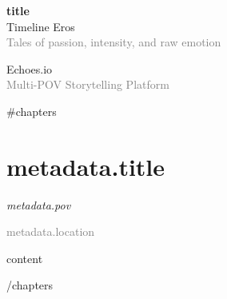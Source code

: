 \documentclass[12pt,a5paper]{book}
\newcommand{\echochapter}[4]{
  \chapter{#1}
  \begin{flushright}
    \textit{\textcolor{erosdark}{#2}} %
  \end{flushright}
  \vspace{0.5em}
  \textcolor{gray}{\small #3} %
  \vspace{1em}
  
  #4 %
}
\newcommand{\timelinetitle}[1]{
  \begin{center}
    {\Huge\textcolor{erosburgundy}{\textbf{#1}}}\\
    \vspace{0.5em}
    {\large\textcolor{erosdark}{Timeline Eros}}\\
    \vspace{0.2em}
    {\small\textcolor{gray}{Tales of passion, intensity, and raw emotion}}
  \end{center}
}
\begin{document}
\thispagestyle{empty}
\vspace*{2cm}
\timelinetitle{{{title}}}
\vfill
\begin{center}
  \textcolor{erosdark}{Echoes.io}\\
  \textcolor{gray}{\small Multi-POV Storytelling Platform}
\end{center}
\newpage

\tableofcontents
\newpage

{{#chapters}}
\echochapter{{{metadata.title}}}{{{metadata.pov}}}{{{metadata.location}}}{
{{content}}
}
\newpage
{{/chapters}}
\end{document}
